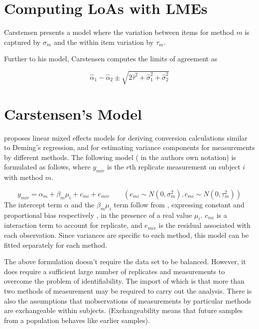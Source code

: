 \documentclass[12pt, a4paper]{report}
\theoremstyle{plain}
\theoremstyle{definition}
\theoremstyle{remark}
\begin{document}
	
	\section{Computing LoAs with LMEs}
	
	
	Carstensen presents a model where the variation between items for
	method $m$ is captured by $\sigma_m$ and the within item variation
	by $\tau_m$.
	
	Further to his model, Carstensen computes the limits of agreement
	as
	
	\[
	\hat{\alpha}_1 - \hat{\alpha}_2 \pm \sqrt{2 \hat{\tau}^2 +
		\hat{\sigma}^2_1 + \hat{\sigma}^2_2}
	\]
	
	
	
	
	\section{Carstensen's Model}
	\citet{BXC2004} proposes linear mixed effects models for deriving
	conversion calculations similar to Deming's regression, and for
	estimating variance components for measurements by different
	methods. The following model ( in the authors own notation) is
	formulated as follows, where $y_{mir}$ is the $r$th replicate
	measurement on subject $i$ with method $m$.
	
	\begin{equation}
	y_{mir}  = \alpha_{m} + \beta_{m}\mu_{i} + c_{mi} + e_{mir} \qquad
	( e_{mi} \sim N(0,\sigma^{2}_{m}), c_{mi} \sim N(0,\tau^{2}_{m}))
	\end{equation}
	The intercept term $\alpha$ and the $\beta_{m}\mu_{i}$ term follow
	from \citet{DunnSEME}, expressing constant and proportional bias
	respectively , in the presence of a real value $\mu_{i}.$
	$c_{mi}$ is a interaction term to account for replicate, and
	$e_{mir}$ is the residual associated with each observation.
	Since variances are specific to each method, this model can be
	fitted separately for each method.
	
	The above formulation doesn't require the data set to be balanced.
	However, it does require a sufficient large number of replicates
	and measurements to overcome the problem of identifiability. The
	import of which is that more than two methods of measurement may
	be required to carry out the analysis. There is also the
	assumptions that mobservations of measurements by particular
	methods are exchangeable within subjects. (Exchangeability means
	that future samples from a population behaves like earlier
	samples).
	
\end{document}
